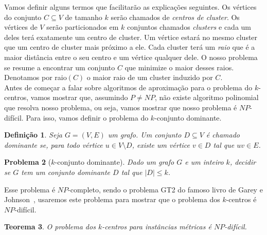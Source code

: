 \documentclass[12pt]{article}
\newtheorem{theorem}{Teorema}[section]
\newtheorem{definition}[theorem]{Definição}
\newtheorem{problem}[theorem]{Problema}
\newcommand{\NP}{\mathit{NP}}
\begin{document}
Vamos definir alguns termos que facilitarão as explicações seguintes. Os vértices do conjunto $C \subseteq V$ de tamanho $k$ serão chamados de \emph{centros de cluster}. Os vértices de $V$ serão particionados em $k$ conjuntos chamados \emph{clusters} e cada um deles terá exatamente um centro de cluster. Um vértice estará no mesmo cluster que um centro de cluster mais próximo a ele. Cada cluster terá um \emph{raio} que é a maior distância entre o seu centro e um vértice qualquer dele. O nosso problema se resume a encontrar um conjunto $C$ que minimize o maior desses raios. Denotamos por raio$(C)$ o maior raio de um cluster induzido por $C$.\\
Antes de começar a falar sobre algoritmos de aproximação para o problema do $k$-centros, vamos mostrar que, assumindo $P\not=\NP$, não existe algoritmo polinomial que resolva nosso problema, ou seja, vamos mostrar que nosso problema é $\NP$-difícil. Para isso, vamos definir o problema do $k$-conjunto dominante.

\begin{definition}
    Seja $G = (V,E)$ um grafo. Um conjunto $D \subseteq V$ é chamado \emph{dominante} se, para todo vértice $u \in V \setminus D$, existe um vértice $v \in D$ tal que $uv \in E$.
\end{definition}

\begin{problem}[$k$-conjunto dominante]
    Dado um grafo $G$ e um inteiro $k$, decidir se $G$ tem um conjunto dominante $D$ tal que $|D| \leq k$.      
\end{problem}
Esse problema é $\NP$-completo, sendo o problema GT2 do famoso livro de Garey e Johnson~\cite{garey1979computers}, usaremos este problema para mostrar que o problema dos $k$-centros é $\NP$-difícil.

\begin{theorem}\label{theorem:2.1}
    O problema dos $k$-centros para instâncias métricas é $\NP$-difícil.
\end{theorem}
\end{document}
